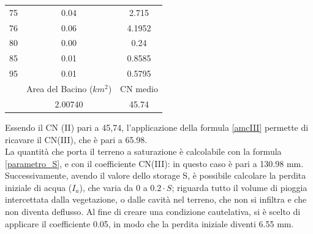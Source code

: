 \begin{table}[H]
\begin{tabular}{ccc}
    75                 & 0.04                           & 2.715             \\
    76                 & 0.06                           & 4.1952            \\
    80                 & 0.00                           & 0.24              \\
    85                 & 0.01                           & 0.8585            \\
    95                 & 0.01                           & 0.5795            \\
    \midrule
          & Area del Bacino ($km^2$) & CN medio\\
   & 2.00740               & 45.74   \\
   \bottomrule
    \end{tabular}
    \end{table}

Essendo il CN (II) pari a 45,74, l'applicazione della formula \ref{amcIII} permette di ricavare il CN(III), che è pari a 65.98.\\
La quantità che porta il terreno a saturazione è calcolabile con la formula \ref{parametro_S}, e con il coefficiente CN(III): in questo caso è pari a 130.98 mm.\\
Successivamente, avendo il valore dello storage S, è possibile calcolare la perdita iniziale di acqua ($I_a$), che varia da 0 a $0.2\cdot S$; riguarda tutto il volume di pioggia intercettata dalla vegetazione, o dalle cavità nel terreno, che non si infiltra e che non diventa deflusso. Al fine di creare una condizione cautelativa, si è scelto di applicare il coefficiente 0.05, in modo che la perdita iniziale diventi 6.55 mm.

